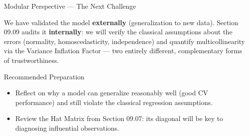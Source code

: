 \documentclass[10pt, aspectratio=169]{beamer}
\begin{document}
\begin{frame}{Modular Perspective --- The Next Challenge}
  \scriptsize
  \begin{retoclase}
    We have validated the model \textbf{externally} (generalization to new data). Section 09.09 audits it \textbf{internally}: we will verify the classical assumptions about the errors (normality, homoscedasticity, independence) and quantify multicollinearity via the Variance Inflation Factor --- two entirely different, complementary forms of trustworthiness.
  \end{retoclase}

  \vspace{0.08cm}
  \pause
  \begin{alertblock}{Recommended Preparation}
    \begin{itemize}\itemsep=0.06cm
      \item Reflect on why a model can generalize reasonably well (good CV performance) and still violate the classical regression assumptions.
      \item Review the Hat Matrix from Section 09.07: its diagonal will be key to diagnosing influential observations.
    \end{itemize}
  \end{alertblock}
\end{frame}
\end{document}
